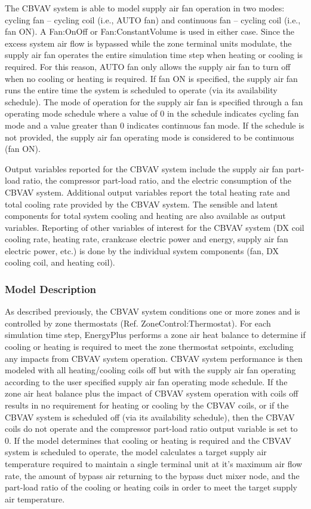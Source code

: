 The CBVAV system is able to model supply air fan operation in two modes: cycling fan -- cycling coil (i.e., AUTO fan) and continuous fan -- cycling coil (i.e., fan ON). A Fan:OnOff or Fan:ConstantVolume is used in either case. Since the excess system air flow is bypassed while the zone terminal units modulate, the supply air fan operates the entire simulation time step when heating or cooling is required. For this reason, AUTO fan only allows the supply air fan to turn off when no cooling or heating is required. If fan ON is specified, the supply air fan runs the entire time the system is scheduled to operate (via its availability schedule). The mode of operation for the supply air fan is specified through a fan operating mode schedule where a value of 0 in the schedule indicates cycling fan mode and a value greater than 0 indicates continuous fan mode. If the schedule is not provided, the supply air fan operating mode is considered to be continuous (fan ON).

Output variables reported for the CBVAV system include the supply air fan part-load ratio, the compressor part-load ratio, and the electric consumption of the CBVAV system. Additional output variables report the total heating rate and total cooling rate provided by the CBVAV system. The sensible and latent components for total system cooling and heating are also available as output variables. Reporting of other variables of interest for the CBVAV system (DX coil cooling rate, heating rate, crankcase electric power and energy, supply air fan electric power, etc.) is done by the individual system components (fan, DX cooling coil, and heating coil).

\subsubsection{Model Description}\label{model-description-2}

As described previously, the CBVAV system conditions one or more zones and is controlled by zone thermostats (Ref. ZoneControl:Thermostat). For each simulation time step, EnergyPlus performs a zone air heat balance to determine if cooling or heating is required to meet the zone thermostat setpoints, excluding any impacts from CBVAV system operation. CBVAV system performance is then modeled with all heating/cooling coils off but with the supply air fan operating according to the user specified supply air fan operating mode schedule. If the zone air heat balance plus the impact of CBVAV system operation with coils off results in no requirement for heating or cooling by the CBVAV coils, or if the CBVAV system is scheduled off (via its availability schedule), then the CBVAV coils do not operate and the compressor part-load ratio output variable is set to 0. If the model determines that cooling or heating is required and the CBVAV system is scheduled to operate, the model calculates a target supply air temperature required to maintain a single terminal unit at it's maximum air flow rate, the amount of bypass air returning to the bypass duct mixer node, and the part-load ratio of the cooling or heating coils in order to meet the target supply air temperature.

